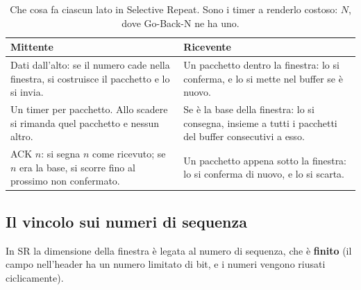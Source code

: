 \begin{table}[H]
\centering
\begin{tabular}{p{} p{}}
\toprule
\textbf{Mittente} & \textbf{Ricevente} \\
\midrule
Dati dall'alto: se il numero cade nella finestra, si costruisce il pacchetto e lo si invia. &
Un pacchetto dentro la finestra: lo si conferma, e lo si mette nel buffer se è nuovo. \\
Un timer per pacchetto. Allo scadere si rimanda quel pacchetto e nessun altro. &
Se è la base della finestra: lo si consegna, insieme a tutti i pacchetti del buffer consecutivi a esso. \\
ACK $n$: si segna $n$ come ricevuto; se $n$ era la base, si scorre fino al prossimo non confermato. &
Un pacchetto appena sotto la finestra: lo si conferma di nuovo, e lo si scarta. \\
\bottomrule
\end{tabular}
\caption{Che cosa fa ciascun lato in Selective Repeat. Sono i timer a renderlo costoso: $N$, dove Go-Back-N ne ha uno.}
\end{table}


\subsection{Il vincolo sui numeri di sequenza}

In SR la dimensione della finestra è legata al numero di sequenza, che è \textbf{finito} (il campo nell'header ha
un numero limitato di bit, e i numeri vengono riusati ciclicamente).

